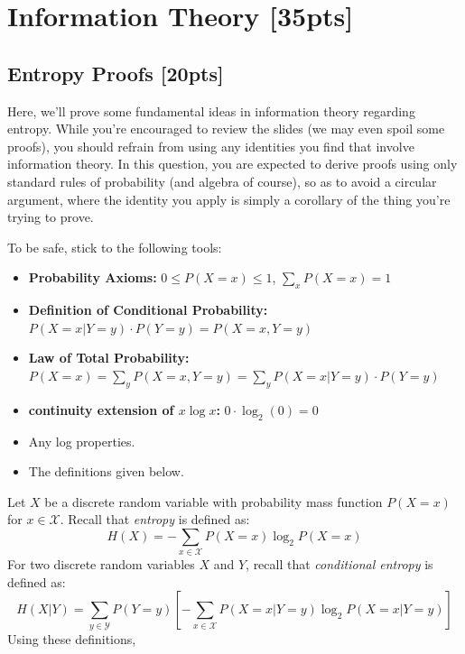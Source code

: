 \section{Information Theory [35pts]}

\subsection{Entropy Proofs [20pts]}
Here, we'll prove some fundamental ideas in information theory regarding entropy. While you're encouraged to review the slides (we may even spoil some proofs), you should refrain from using any identities you find that involve information theory. In this question, you are expected to derive proofs using only standard rules of probability (and algebra of course), so as to avoid a circular argument, where the identity you apply is simply a corollary of the thing you're trying to prove. 

\smallskip To be safe, stick to the following tools:
\begin{itemize}
    \itemsep0em
    \item \textbf{Probability Axioms:} $0\leq P(X=x) \leq 1$, $\sum_x P(X=x) = 1$
    \item \textbf{Definition of Conditional Probability:} $P(X=x | Y=y)\cdot P(Y=y) = P(X=x, Y=y)$
    \item \textbf{Law of Total Probability:} $P(X=x) = \sum_y P(X=x, Y=y) = \sum_y P(X=x | Y=y)\cdot P(Y=y)$
    \item \textbf{continuity extension of $x\log x$:} $0 \cdot \log_2 (0) = 0$
    \item Any log properties.
    \item The definitions given below.
\end{itemize}


Let $X$ be a discrete random variable with probability mass function $P(X=x)$ for $x \in \mathcal{X}$. Recall that \textit{entropy} is defined as:
$$H(X) = -\sum_{x \in \mathcal{X}} P(X=x) \log_2 P(X=x)$$
For two discrete random variables $X$ and $Y$, recall that \textit{conditional entropy} is defined as:
$$H(X|Y) = \sum_{y \in \mathcal{Y}} P(Y=y) \left[ -\sum_{x \in \mathcal{X}} P(X=x | Y=y) \log_2 P(X=x | Y=y) \right]$$
Using these definitions,


